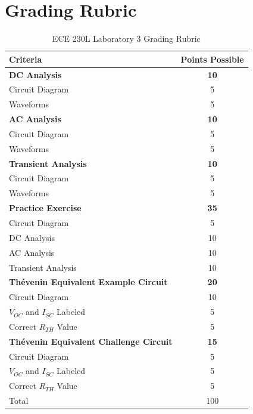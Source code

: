 \documentclass[12pt]{../manual}
\begin{document}
\section*{Grading Rubric}
\vfill %
\begin{table}[ht!]
\caption{ECE 230L Laboratory 3 Grading Rubric}
\centering
\begin{tabular}{l|c} \hline
Criteria & Points Possible \\ \hline \hline
\textbf{DC Analysis}			& \textbf{10} \\
Circuit Diagram 				& 5 \\
Waveforms 						& 5 \\ \hline
\textbf{AC Analysis}			& \textbf{10} \\
Circuit Diagram 				& 5 \\
Waveforms 						& 5 \\ \hline
\textbf{Transient Analysis}		& \textbf{10} \\
Circuit Diagram 				& 5 \\ 
Waveforms 						& 5 \\ \hline
\textbf{Practice Exercise}		& \textbf{35} \\
Circuit Diagram 				& 5 \\
DC Analysis						& 10 \\
AC Analysis						& 10 \\
Transient Analysis				& 10 \\ \hline
\textbf{Th\'evenin Equivalent Example Circuit} & \textbf{20} \\
Circuit Diagram					& 10 \\
$V_{OC}$ and $I_{SC}$ Labeled	& 5 \\
Correct $R_{TH}$ Value			& 5 \\ \hline
\textbf{Th\'evenin Equivalent Challenge Circuit} & \textbf{15} \\
Circuit Diagram					& 5 \\
$V_{OC}$ and $I_{SC}$ Labeled	& 5 \\
Correct $R_{TH}$ Value			& 5 \\ \hline \hline
Total							& 100 \\ \hline
\end{tabular}
\end{table}
\vfill %
%
\newpage
\appendix
\appendixpage
\addappheadtotoc
\end{document}
